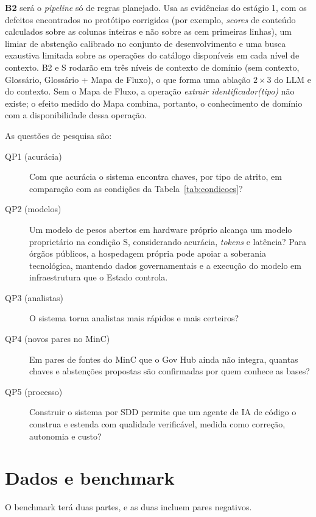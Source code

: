 \textbf{B2} será o \emph{pipeline} só de regras planejado. Usa as evidências
do estágio 1, com os defeitos encontrados no protótipo corrigidos (por
exemplo, \emph{scores} de conteúdo calculados sobre as colunas inteiras e não
sobre as cem primeiras linhas), um limiar de abstenção calibrado no conjunto
de desenvolvimento e uma busca exaustiva limitada sobre as operações do
catálogo disponíveis em cada nível de contexto. B2 e S rodarão em três níveis
de contexto de domínio (sem contexto, Glossário, Glossário + Mapa de Fluxo),
o que forma uma ablação $2 \times 3$ do LLM e do contexto. Sem o Mapa de
Fluxo, a operação \emph{extrair identificador(tipo)} não existe; o efeito
medido do Mapa combina, portanto, o conhecimento de domínio com a
disponibilidade dessa operação.

As questões de pesquisa são:

\begin{description}
\item[QP1 (acurácia)] Com que acurácia o sistema encontra chaves, por tipo de
atrito, em comparação com as condições da Tabela~\ref{tab:condicoes}?
\item[QP2 (modelos)] Um modelo de pesos abertos em hardware próprio alcança um
modelo proprietário na condição S, considerando acurácia, \emph{tokens} e
latência? Para órgãos públicos, a hospedagem própria pode apoiar a soberania
tecnológica, mantendo dados governamentais e a execução do modelo em
infraestrutura que o Estado controla.
\item[QP3 (analistas)] O sistema torna analistas mais rápidos e mais
certeiros?
\item[QP4 (novos pares no MinC)] Em pares de fontes do MinC que o Gov Hub
ainda não integra, quantas chaves e abstenções propostas são confirmadas por
quem conhece as bases?
\item[QP5 (processo)] Construir o sistema por SDD permite que um agente de IA
de código o construa e estenda com qualidade verificável, medida como
correção, autonomia e custo?
\end{description}

\section{Dados e benchmark}
\label{sec:metodologia-ground-truth}

O benchmark terá duas partes, e as duas incluem pares negativos.

